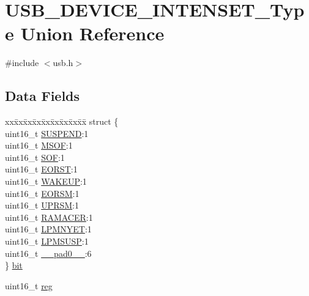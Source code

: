 \hypertarget{union_u_s_b___d_e_v_i_c_e___i_n_t_e_n_s_e_t___type}{}\section{U\+S\+B\+\_\+\+D\+E\+V\+I\+C\+E\+\_\+\+I\+N\+T\+E\+N\+S\+E\+T\+\_\+\+Type Union Reference}
\label{union_u_s_b___d_e_v_i_c_e___i_n_t_e_n_s_e_t___type}


{\ttfamily \#include $<$usb.\+h$>$}

\subsection*{Data Fields}
\begin{DoxyCompactItemize}
\item 
\begin{tabbing}
xx\=xx\=xx\=xx\=xx\=xx\=xx\=xx\=xx\=\kill
struct \{\\
\>uint16\_t \mbox{\hyperlink{union_u_s_b___d_e_v_i_c_e___i_n_t_e_n_s_e_t___type_a26ef1067b52043f3d704c791d59dfb72}{SUSPEND}}:1\\
\>uint16\_t \mbox{\hyperlink{union_u_s_b___d_e_v_i_c_e___i_n_t_e_n_s_e_t___type_a21f55e475a4e07c45c411a1114edee22}{MSOF}}:1\\
\>uint16\_t \mbox{\hyperlink{union_u_s_b___d_e_v_i_c_e___i_n_t_e_n_s_e_t___type_a33a02010418ddf6b626c6b60c38b6eef}{SOF}}:1\\
\>uint16\_t \mbox{\hyperlink{union_u_s_b___d_e_v_i_c_e___i_n_t_e_n_s_e_t___type_ad93b1a5ffc2f26c7ec1e53bacee026ab}{EORST}}:1\\
\>uint16\_t \mbox{\hyperlink{union_u_s_b___d_e_v_i_c_e___i_n_t_e_n_s_e_t___type_a8daebdfb4a00acfdbe16023d636e3887}{WAKEUP}}:1\\
\>uint16\_t \mbox{\hyperlink{union_u_s_b___d_e_v_i_c_e___i_n_t_e_n_s_e_t___type_a61ae5e49cbf62ef2b52ef49a19d9e5b5}{EORSM}}:1\\
\>uint16\_t \mbox{\hyperlink{union_u_s_b___d_e_v_i_c_e___i_n_t_e_n_s_e_t___type_a21d16bc73d976e53f035b7dd20e1160b}{UPRSM}}:1\\
\>uint16\_t \mbox{\hyperlink{union_u_s_b___d_e_v_i_c_e___i_n_t_e_n_s_e_t___type_a0391330e7e210b908b26fec3fe07622f}{RAMACER}}:1\\
\>uint16\_t \mbox{\hyperlink{union_u_s_b___d_e_v_i_c_e___i_n_t_e_n_s_e_t___type_a31103e6ae71b4b0a2c6f4e04bc791f9a}{LPMNYET}}:1\\
\>uint16\_t \mbox{\hyperlink{union_u_s_b___d_e_v_i_c_e___i_n_t_e_n_s_e_t___type_a7daf027f24967e7b249ddb5179211ec9}{LPMSUSP}}:1\\
\>uint16\_t \mbox{\hyperlink{union_u_s_b___d_e_v_i_c_e___i_n_t_e_n_s_e_t___type_a77132c2c26a75f5b8751b235cda23828}{\_\_pad0\_\_}}:6\\
\} \mbox{\hyperlink{union_u_s_b___d_e_v_i_c_e___i_n_t_e_n_s_e_t___type_a4749f67120ed6957b4800f2eb903a9f9}{bit}}\\

\end{tabbing}\item 
uint16\+\_\+t \mbox{\hyperlink{union_u_s_b___d_e_v_i_c_e___i_n_t_e_n_s_e_t___type_a11760f5020019f4aa8cb02e694f7cc44}{reg}}
\end{DoxyCompactItemize}


